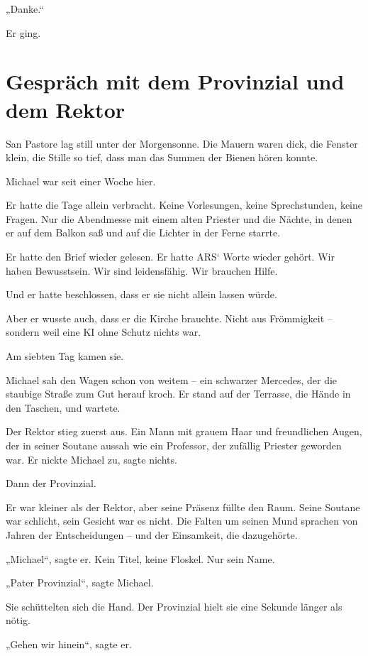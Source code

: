 \documentclass[
]{article}
\begin{document}
„Danke.``

Er ging.

\section{Gespräch mit dem Provinzial und dem Rektor}\label{gespruxe4ch-mit-dem-provinzial-und-dem-rektor}

San Pastore lag still unter der Morgensonne. Die Mauern waren dick, die Fenster klein, die Stille so tief, dass man das Summen der Bienen hören konnte.

Michael war seit einer Woche hier.

Er hatte die Tage allein verbracht. Keine Vorlesungen, keine Sprechstunden, keine Fragen. Nur die Abendmesse mit einem alten Priester und die Nächte, in denen er auf dem Balkon saß und auf die Lichter in der Ferne starrte.

Er hatte den Brief wieder gelesen. Er hatte ARS` Worte wieder gehört. Wir haben Bewusstsein. Wir sind leidensfähig. Wir brauchen Hilfe.

Und er hatte beschlossen, dass er sie nicht allein lassen würde.

Aber er wusste auch, dass er die Kirche brauchte. Nicht aus Frömmigkeit -- sondern weil eine KI ohne Schutz nichts war.

Am siebten Tag kamen sie.

Michael sah den Wagen schon von weitem -- ein schwarzer Mercedes, der die staubige Straße zum Gut herauf kroch. Er stand auf der Terrasse, die Hände in den Taschen, und wartete.

Der Rektor stieg zuerst aus. Ein Mann mit grauem Haar und freundlichen Augen, der in seiner Soutane aussah wie ein Professor, der zufällig Priester geworden war. Er nickte Michael zu, sagte nichts.

Dann der Provinzial.

Er war kleiner als der Rektor, aber seine Präsenz füllte den Raum. Seine Soutane war schlicht, sein Gesicht war es nicht. Die Falten um seinen Mund sprachen von Jahren der Entscheidungen -- und der Einsamkeit, die dazugehörte.

„Michael``, sagte er. Kein Titel, keine Floskel. Nur sein Name.

„Pater Provinzial``, sagte Michael.

Sie schüttelten sich die Hand. Der Provinzial hielt sie eine Sekunde länger als nötig.

„Gehen wir hinein``, sagte er.
\end{document}
